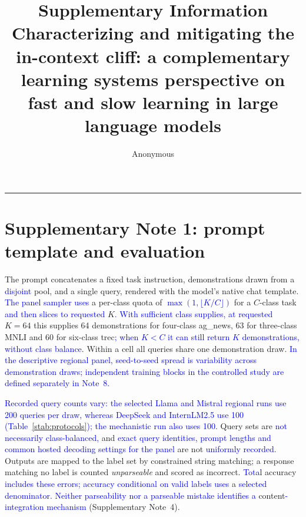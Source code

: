 \documentclass[11pt]{article}
\title{Supplementary Information\\[4pt]
\large Characterizing and mitigating the in-context cliff:
a complementary learning systems perspective on fast and slow learning in large language models}
\author{Anonymous}
\date{}
\begin{document}
\maketitle

\tableofcontents
\bigskip
\hrule

\section*{Supplementary Note 1: prompt template and evaluation}
\label{snote:prompt}

The prompt concatenates a fixed task instruction, demonstrations drawn from a
\textcolor{blue}{disjoint} pool, and a single query, rendered with the model's native chat template.
\textcolor{blue}{The panel sampler uses} a per-class quota of
\textcolor{blue}{$\max(1,\lfloor K/C\rfloor)$} for a $C$-class task \textcolor{blue}{and then slices to requested} $K$\textcolor{blue}{.
With sufficient class supplies, at requested} $K{=}64$ this supplies 64 demonstrations for
four-class ag\_news, 63 for three-class MNLI and 60 for six-class trec\textcolor{blue}{; when $K<C$ it can
still return $K$ demonstrations, without class balance}. Within a
cell all queries share one demonstration draw. \textcolor{blue}{In the descriptive regional panel,
seed-to-seed spread is variability across demonstration draws; independent training
blocks in the controlled study are defined separately in Note~8.}

\textcolor{blue}{Recorded query counts vary: the selected Llama and Mistral regional runs use 200 queries
per draw, whereas DeepSeek and InternLM2.5 use 100 (Table}~\textcolor{blue}{\ref{stab:protocols}}\textcolor{blue}{); the
mechanistic run also uses 100.} Query sets are \textcolor{blue}{not necessarily class-balanced,} and \textcolor{blue}{exact
query identities, prompt lengths and common hosted decoding settings for the panel} are not
\textcolor{blue}{uniformly recorded}. Outputs are mapped to the label set by constrained string matching;
a response matching no label is counted \emph{unparseable} and scored as incorrect.
\textcolor{blue}{Total} accuracy \textcolor{blue}{includes these errors; accuracy conditional on valid labels uses} a \textcolor{blue}{selected
denominator. Neither parseability nor a parseable mistake identifies a} content\textcolor{blue}{-integration
mechanism} (Supplementary Note~4).
\end{document}
